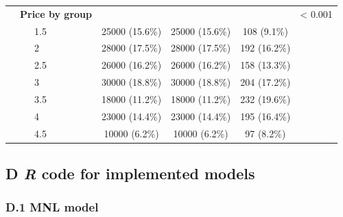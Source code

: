 \documentclass[12pt,]{article}
\begin{document}
\begin{table}[!htbp]
\begin{tabular}{@{\extracolsep{5pt}}llcccc}
 & \textbf{Price by group} &  &  &  & < 0.001\\
 & ~~~1.5 & 25000 (15.6\%) & 25000 (15.6\%) & 108 (9.1\%) & \\
 & ~~~2 & 28000 (17.5\%) & 28000 (17.5\%) & 192 (16.2\%) & \\
 & ~~~2.5 & 26000 (16.2\%) & 26000 (16.2\%) & 158 (13.3\%) & \\
 & ~~~3 & 30000 (18.8\%) & 30000 (18.8\%) & 204 (17.2\%) & \\
 & ~~~3.5 & 18000 (11.2\%) & 18000 (11.2\%) & 232 (19.6\%) & \\
 & ~~~4 & 23000 (14.4\%) & 23000 (14.4\%) & 195 (16.4\%) & \\
 & ~~~4.5 & 10000 (6.2\%) & 10000 (6.2\%) & 97 (8.2\%) & \\
\hline
\end{tabular}
\end{table}

\FloatBarrier

\newpage

\hypertarget{d-r-code-for-implemented-models}{%
\subsection*{\texorpdfstring{D \emph{R} code for implemented
models}{D R code for implemented models}}\label{d-r-code-for-implemented-models}}

\hypertarget{d.1-mnl-model}{%
\subsubsection*{D.1 MNL model}\label{d.1-mnl-model}}
\end{document}
